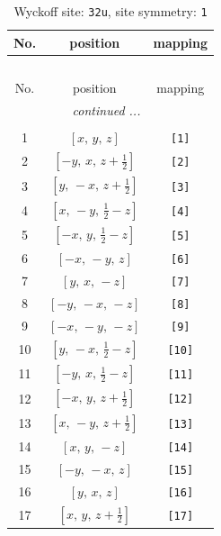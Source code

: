 \documentclass[fleqn,8pt]{jsarticle}
\begin{document}
\renewcommand{\arraystretch}{1.2}
\begin{longtable}{ccc}
\caption{Wyckoff site: {\tt 32u}, site symmetry: {\tt 1}}
 \\
 \hline \hline
No. & position & mapping \\ \hline \endfirsthead

\multicolumn{2}{l}{\tablename\ \thetable{}} \\
 \hline \hline
No. & position & mapping \\ \hline \endhead

 \hline \hline
\multicolumn{2}{r}{\footnotesize\it continued ...} \\ \endfoot

 \hline \hline
\multicolumn{2}{r}{} \\ \endlastfoot

1 & $\left[ x,\, y,\, z \right]$ & {\tt [1]} \\ \hline
2 & $\left[ - y,\, x,\, z + \frac{1}{2} \right]$ & {\tt [2]} \\ \hline
3 & $\left[ y,\, - x,\, z + \frac{1}{2} \right]$ & {\tt [3]} \\ \hline
4 & $\left[ x,\, - y,\, \frac{1}{2} - z \right]$ & {\tt [4]} \\ \hline
5 & $\left[ - x,\, y,\, \frac{1}{2} - z \right]$ & {\tt [5]} \\ \hline
6 & $\left[ - x,\, - y,\, z \right]$ & {\tt [6]} \\ \hline
7 & $\left[ y,\, x,\, - z \right]$ & {\tt [7]} \\ \hline
8 & $\left[ - y,\, - x,\, - z \right]$ & {\tt [8]} \\ \hline
9 & $\left[ - x,\, - y,\, - z \right]$ & {\tt [9]} \\ \hline
10 & $\left[ y,\, - x,\, \frac{1}{2} - z \right]$ & {\tt [10]} \\ \hline
11 & $\left[ - y,\, x,\, \frac{1}{2} - z \right]$ & {\tt [11]} \\ \hline
12 & $\left[ - x,\, y,\, z + \frac{1}{2} \right]$ & {\tt [12]} \\ \hline
13 & $\left[ x,\, - y,\, z + \frac{1}{2} \right]$ & {\tt [13]} \\ \hline
14 & $\left[ x,\, y,\, - z \right]$ & {\tt [14]} \\ \hline
15 & $\left[ - y,\, - x,\, z \right]$ & {\tt [15]} \\ \hline
16 & $\left[ y,\, x,\, z \right]$ & {\tt [16]} \\ \hline
17 & $\left[ x,\, y,\, z + \frac{1}{2} \right]$ & {\tt [17]} \\ \hline

\end{longtable}
\end{document}
